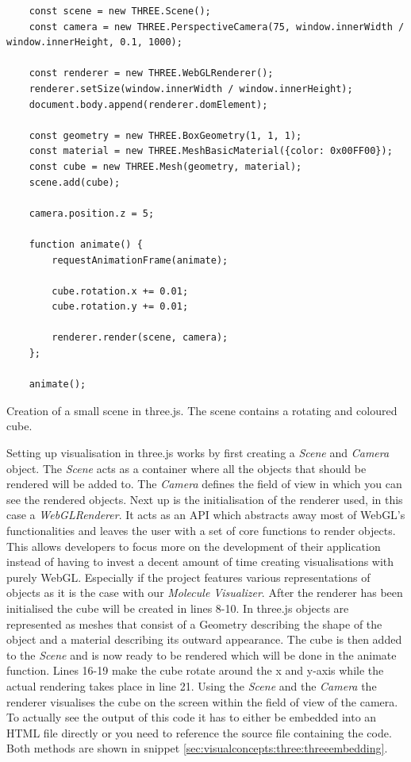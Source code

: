 \begin{listing}[H]
	\begin{verbatim}
	const scene = new THREE.Scene();
	const camera = new THREE.PerspectiveCamera(75, window.innerWidth / window.innerHeight, 0.1, 1000);

	const renderer = new THREE.WebGLRenderer();
	renderer.setSize(window.innerWidth / window.innerHeight);
	document.body.append(renderer.domElement);

	const geometry = new THREE.BoxGeometry(1, 1, 1);
	const material = new THREE.MeshBasicMaterial({color: 0x00FF00});
	const cube = new THREE.Mesh(geometry, material);
	scene.add(cube);

	camera.position.z = 5;

	function animate() {
		requestAnimationFrame(animate);
	
		cube.rotation.x += 0.01;
		cube.rotation.y += 0.01;
	
		renderer.render(scene, camera);
	};

	animate();
	\end{verbatim}
	\caption{Creation of a small scene in three.js. The scene contains a rotating and coloured cube.}
	\label{sec:visualconcepts:three:toyscene}
\end{listing}
Setting up visualisation in three.js works by first creating a \textit{Scene} and \textit{Camera} object. The \textit{Scene} acts as a container where all the objects that should be rendered will be added to. The \textit{Camera} defines the field of view in which you can see the rendered objects. Next up is the initialisation of the renderer used, in this case a \textit{WebGLRenderer}. It acts as an API which abstracts away most of WebGL's functionalities and leaves the user with a set of core functions to render objects. This allows developers to focus more on the development of their application instead of having to invest a decent amount of time creating visualisations with purely WebGL. Especially if the project features various representations of objects as it is the case with our \textit{Molecule Visualizer}. After the renderer has been initialised the cube will be created in lines 8-10. In three.js objects are represented as meshes that consist of a Geometry describing the shape of the object and a material describing its outward appearance. The cube is then added to the \textit{Scene} and is now ready to be rendered which will be done in the animate function. Lines 16-19 make the cube rotate around the x and y-axis while the actual rendering takes place in line 21. Using the \textit{Scene} and the \textit{Camera} the renderer visualises the cube on the screen within the field of view of the camera. To actually see the output of this code it has to either be embedded into an HTML file directly or you need to reference the source file containing the code. Both methods are shown in snippet \ref{sec:visualconcepts:three:threeembedding}.

